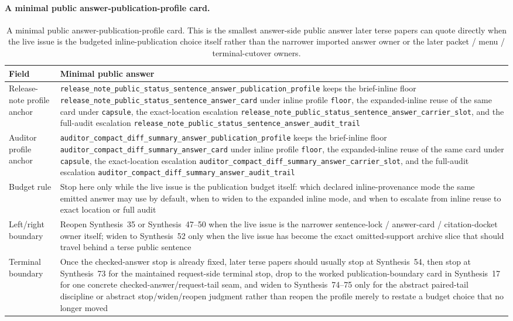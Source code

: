 \documentclass[11pt]{article}
\begin{document}
\paragraph{A minimal public answer-publication-profile card.}
\begin{table}[t]
\centering
\small
\begin{tabularx}{\linewidth}{@{}lX@{}}
\toprule
Field & Minimal public answer \\
\midrule
Release-note profile anchor & \nolinkurl{release_note_public_status_sentence_answer_publication_profile} keeps the brief-inline floor \nolinkurl{release_note_public_status_sentence_answer_card} under inline profile \nolinkurl{floor}, the expanded-inline reuse of the same card under \nolinkurl{capsule}, the exact-location escalation \nolinkurl{release_note_public_status_sentence_answer_carrier_slot}, and the full-audit escalation \nolinkurl{release_note_public_status_sentence_answer_audit_trail} \\
Auditor profile anchor & \nolinkurl{auditor_compact_diff_summary_answer_publication_profile} keeps the brief-inline floor \nolinkurl{auditor_compact_diff_summary_answer_card} under inline profile \nolinkurl{floor}, the expanded-inline reuse of the same card under \nolinkurl{capsule}, the exact-location escalation \nolinkurl{auditor_compact_diff_summary_answer_carrier_slot}, and the full-audit escalation \nolinkurl{auditor_compact_diff_summary_answer_audit_trail} \\
Budget rule & Stop here only while the live issue is the publication budget itself: which declared inline-provenance mode the same emitted answer may use by default, when to widen to the expanded inline mode, and when to escalate from inline reuse to exact location or full audit \\
Left/right boundary & Reopen Synthesis~35 or Synthesis~47--50 when the live issue is the narrower sentence-lock / answer-card / citation-docket owner itself; widen to Synthesis~52 only when the live issue has become the exact omitted-support archive slice that should travel behind a terse public sentence \\
Terminal boundary & Once the checked-answer stop is already fixed, later terse papers should usually stop at Synthesis~54, then stop at Synthesis~73 for the maintained request-side terminal stop, drop to the worked publication-boundary card in Synthesis~17 for one concrete checked-answer/request-tail seam, and widen to Synthesis~74--75 only for the abstract paired-tail discipline or abstract stop/widen/reopen judgment rather than reopen the profile merely to restate a budget choice that no longer moved \\
\bottomrule
\end{tabularx}
\caption{A minimal public answer-publication-profile card. This is the smallest answer-side public answer later terse papers can quote directly when the live issue is the budgeted inline-publication choice itself rather than the narrower imported answer owner or the later packet / menu / terminal-cutover owners.}
\label{tab:minimal-public-answer-publication-profile-card}
\end{table}
\end{document}
